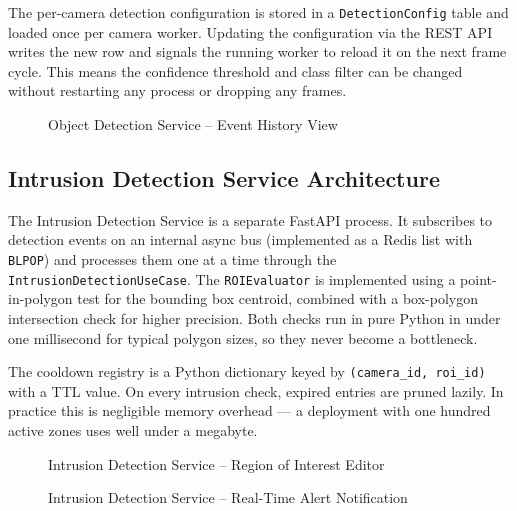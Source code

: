 \hspace{0.8cm}The per-camera detection configuration is stored in a \texttt{DetectionConfig} table and loaded once per camera worker. Updating the configuration via the REST API writes the new row and signals the running worker to reload it on the next frame cycle. This means the confidence threshold and class filter can be changed without restarting any process or dropping any frames.

\begin{figure}[H]
\centering
{}
\caption{Object Detection Service -- Event History View}
\label{fig:s3_detection_ui}
\end{figure}

\subsection{Intrusion Detection Service Architecture}
\label{subsec:s3_intrusion_impl}

\hspace{0.8cm}The Intrusion Detection Service is a separate FastAPI process. It subscribes to detection events on an internal async bus (implemented as a Redis list with \texttt{BLPOP}) and processes them one at a time through the \texttt{IntrusionDetectionUseCase}. The \texttt{ROIEvaluator} is implemented using a point-in-polygon test for the bounding box centroid, combined with a box-polygon intersection check for higher precision. Both checks run in pure Python in under one millisecond for typical polygon sizes, so they never become a bottleneck.

\hspace{0.8cm}The cooldown registry is a Python dictionary keyed by \texttt{(camera\_id, roi\_id)} with a TTL value. On every intrusion check, expired entries are pruned lazily. In practice this is negligible memory overhead --- a deployment with one hundred active zones uses well under a megabyte.

\begin{figure}[H]
\centering
{}
\caption{Intrusion Detection Service -- Region of Interest Editor}
\label{fig:s3_roi_editor}
\end{figure}

\begin{figure}[H]
\centering
{}
\caption{Intrusion Detection Service -- Real-Time Alert Notification}
\label{fig:s3_alert_dashboard}
\end{figure}

